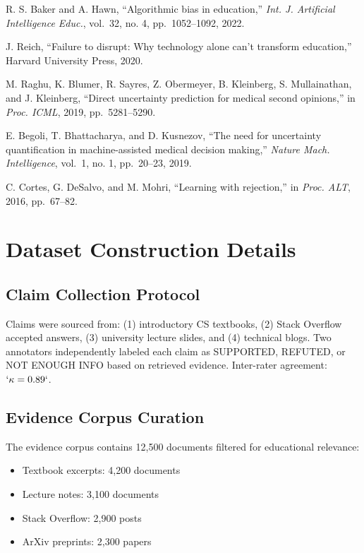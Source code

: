 R. S. Baker and A. Hawn, ``Algorithmic bias in education,'' \emph{Int. J. Artificial Intelligence Educ.}, vol.~32, no. 4, pp.~1052--1092, 2022.

J. Reich, ``Failure to disrupt: Why technology alone can't transform education,'' Harvard University Press, 2020.

M. Raghu, K. Blumer, R. Sayres, Z. Obermeyer, B. Kleinberg, S. Mullainathan, and J. Kleinberg, ``Direct uncertainty prediction for medical second opinions,'' in \emph{Proc. ICML}, 2019, pp.~5281--5290.

E. Begoli, T. Bhattacharya, and D. Kusnezov, ``The need for uncertainty quantification in machine-assisted medical decision making,'' \emph{Nature Mach. Intelligence}, vol.~1, no. 1, pp.~20--23, 2019.

C. Cortes, G. DeSalvo, and M. Mohri, ``Learning with rejection,'' in \emph{Proc. ALT}, 2016, pp.~67--82.

\section{Dataset Construction Details}\label{dataset-construction-details}

\subsection{Claim Collection Protocol}\label{claim-collection-protocol}

Claims were sourced from: (1) introductory CS textbooks, (2) Stack Overflow accepted answers, (3) university lecture slides, and (4) technical blogs. Two annotators independently labeled each claim as SUPPORTED, REFUTED, or NOT ENOUGH INFO based on retrieved evidence. Inter-rater agreement: \(`\kappa = 0.89`\).

\subsection{Evidence Corpus Curation}\label{evidence-corpus-curation}

The evidence corpus contains 12,500 documents filtered for educational relevance:

\begin{itemize}
\item
  Textbook excerpts: 4,200 documents
\item
  Lecture notes: 3,100 documents
\item
  Stack Overflow: 2,900 posts
\item
  ArXiv preprints: 2,300 papers
\end{itemize}

